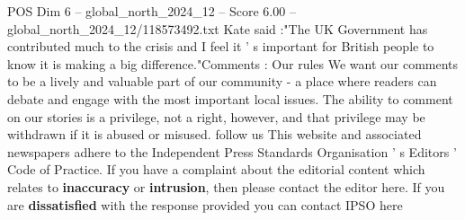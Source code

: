 \begin{textsample}{POS Dim 6 – global\_north\_2024\_12 – Score 6.00 – global\_north\_2024\_12/118573492.txt}
Kate said :"The UK Government has contributed much to the crisis and I feel it ' s important for British people to know it is making a big difference."Comments : Our rules We want our comments to be a lively and valuable part of our community - a place where readers can debate and engage with the most important local issues.
The ability to comment on our stories is a privilege, not a right, however, and that privilege may be withdrawn if it is abused or misused. follow us This website and associated newspapers adhere to the Independent Press Standards Organisation ' s Editors ' Code of Practice.
If you have a complaint about the editorial content which relates to \textbf{inaccuracy} or \textbf{intrusion}, then please contact the editor here.
If you are \textbf{dissatisfied} with the response provided you can contact IPSO here

\end{textsample}

